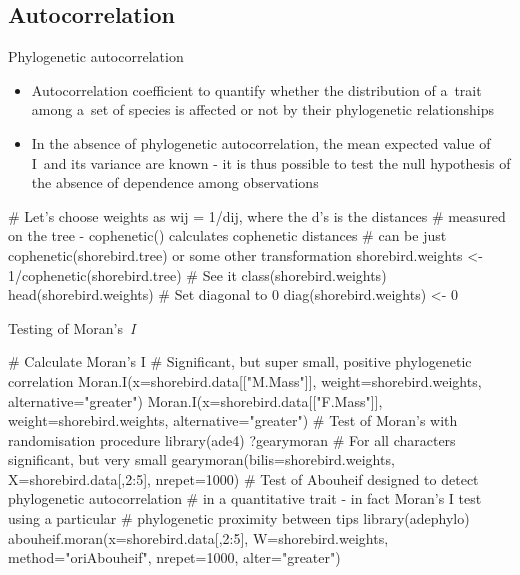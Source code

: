 \documentclass[compress, ucs, xelatex, 11pt, xcolor=svgnames, aspectratio=169,
	hyperref={
		bookmarks=true,
		unicode=true,
		colorlinks=true,
		pdftitle={Molecular data in R},
		plainpages=false,
		pdfauthor={Vojtech Zeisek},
		pdfsubject={Course about phylogeny and evolution in R},
		pdfcreator={XeLaTeX},
		pdfkeywords={R, evolution, phylogeny, molecular data},
		linkcolor=Crimson, %
		anchorcolor=Magenta, %
		citecolor=Magenta, %
		filecolor=Magenta, %
		menucolor=Magenta, %
		urlcolor=DodgerBlue, %
		pdftex},
	url={hyphens, lowtilde} %
	]{beamer}
\begin{document}
\subsection{Autocorrelation}

\begin{frame}[fragile]{Phylogenetic autocorrelation}
	\begin{itemize}
		\item Autocorrelation coefficient to quantify whether the distribution of a~trait among a~set of species is affected or not by their phylogenetic relationships
		\item In the absence of phylogenetic autocorrelation, the mean expected value of I~and its variance are known - it is thus possible to test the null hypothesis of the absence of dependence among observations
	\end{itemize}
	\begin{spluscode}
    # Let's choose weights as wij = 1/dij, where the d’s is the distances
    # measured on the tree - cophenetic() calculates cophenetic distances
    # can be just cophenetic(shorebird.tree) or some other transformation
    shorebird.weights <- 1/cophenetic(shorebird.tree)
    # See it
    class(shorebird.weights)
    head(shorebird.weights)
    # Set diagonal to 0
    diag(shorebird.weights) <- 0
	\end{spluscode}
\end{frame}

\begin{frame}[fragile]{Testing of Moran's~\textit{I}}
	\begin{spluscode}
    # Calculate Moran's I
    # Significant, but super small, positive phylogenetic correlation
    Moran.I(x=shorebird.data[["M.Mass"]], weight=shorebird.weights,
      alternative="greater")
    Moran.I(x=shorebird.data[["F.Mass"]], weight=shorebird.weights,
      alternative="greater")
    # Test of Moran's with randomisation procedure
    library(ade4)
    ?gearymoran
    # For all characters significant, but very small
    gearymoran(bilis=shorebird.weights, X=shorebird.data[,2:5], nrepet=1000)
    # Test of Abouheif designed to detect phylogenetic autocorrelation
    # in a quantitative trait - in fact Moran's I test using a particular
    # phylogenetic proximity between tips
    library(adephylo)
    abouheif.moran(x=shorebird.data[,2:5], W=shorebird.weights,
      method="oriAbouheif", nrepet=1000, alter="greater")
	\end{spluscode}
\end{frame}
\end{document}
